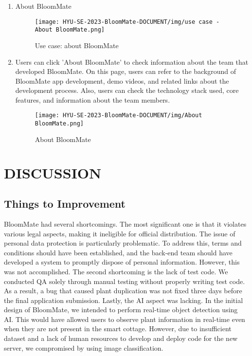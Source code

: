 \documentclass[conference, a4paper]{IEEEtran}
\begin{document}
\begin{enumerate}
    \item About BloomMate
    \begin{figure}[h]
    \centerline{
        \texttt{[image: HYU-SE-2023-BloomMate-DOCUMENT/img/use case - About BloomMate.png]}
    }
    \label{fig}
    \caption{Use case: about BloomMate}
    \end{figure}
    
    \item[]Users can click 'About BloomMate' to check information about the team that developed BloomMate. On this page, users can refer to the background of BloomMate app development, demo videos, and related links about the development process. Also, users can check the technology stack used, core features, and information about the team members.
    
    \begin{figure}[h]
    \centerline{
        \texttt{[image: HYU-SE-2023-BloomMate-DOCUMENT/img/About BloomMate.png]}
    }
    \label{fig}
    \caption{About BloomMate}
    \end{figure}
\end{enumerate}

\section{DISCUSSION}
\subsection{Things to Improvement}
BloomMate had several shortcomings. The most significant one is that it violates various legal aspects, making it ineligible for official distribution. The issue of personal data protection is particularly problematic. To address this, terms and conditions should have been established, and the back-end team should have developed a system to promptly dispose of personal information. However, this was not accomplished. The second shortcoming is the lack of test code. We conducted QA solely through manual testing without properly writing test code. As a result, a bug that caused plant duplication was not fixed three days before the final application submission. Lastly, the AI aspect was lacking. In the initial design of BloomMate, we intended to perform real-time object detection using AI. This would have allowed users to observe plant information in real-time even when they are not present in the smart cottage. However, due to insufficient dataset and a lack of human resources to develop and deploy code for the new server, we compromised by using image classification. \\
\end{document}

